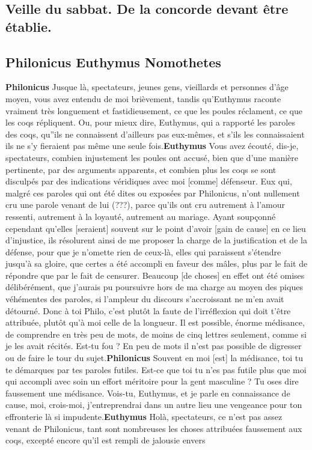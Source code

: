 \documentclass[12pt]{book}
\begin{document}
\begin{pages}
        \begin{Rightside}
        \beginnumbering
            \pstart\section*{Veille du sabbat. De la concorde devant être établie.}\pend\pstart\subsection*{ Philonicus Euthymus Nomothetes}\pend\pstart\textbf{Philonicus}\hspace{1cm} Jusque là, spectateurs, jeunes gens, vieillards et personnes d'âge moyen, vous avez entendu de moi brièvement, tandis qu'Euthymus raconte vraiment très longuement et fastidieusement, ce que les poules réclament, ce que les coqs répliquent. Ou, pour mieux dire, Euthymus, qui a rapporté les paroles des coqs, qu''ils ne connaissent d'ailleurs pas eux-mêmes, et s'ils les connaissaient ils ne s'y fieraient pas même une seule fois.\pend\pstart\textbf{Euthymus }\hspace{1cm} Vous avez écouté, dis-je, spectateurs, combien injustement les poules ont accusé, bien que d'une manière pertinente, par des arguments apparents, et combien plus les coqs se sont disculpés par des indications véridiques avec moi [comme] défenseur. Eux qui, malgré ces paroles qui ont été dites ou exposées par Philonicus, n'ont nullement cru une parole venant de lui (???), parce qu'ils ont cru autrement à l'amour ressenti, autrement à la loyauté, autrement au mariage. Ayant soupçonné cependant qu'elles [seraient] souvent sur le point d'avoir [gain de cause] en ce lieu d'injustice, ils résolurent ainsi de me proposer la charge de la justification et de la défense, pour que je n'omette rien de ceux-là, elles qui paraissent s'étendre jusqu'à sa gloire, que certes a été accompli en faveur des mâles, plus par le fait de répondre que par le fait de censurer. Beaucoup [de choses] en effet ont été omises délibérément, que j'aurais pu poursuivre hors de ma charge au moyen des piques véhémentes des paroles, si l'ampleur du discours s'accroissant ne m'en avait détourné. Donc à toi Philo, c'est plutôt la faute de l'irréflexion qui doit t'être attribuée, plutôt qu'à moi celle de la longueur. Il est possible, énorme médisance, de comprendre en très peu de mots, de moins de cinq lettres seulement, comme si je les avait récités. Est-tu fou ? En peu de mots il n'est pas possible de digresser ou de faire le tour du sujet.\pend\pstart\textbf{Philonicus }\hspace{1cm} Souvent en moi [est] la médisance, toi tu te démarques par tes paroles futiles. Est-ce que toi tu n'es pas futile plus que moi qui accompli avec soin un effort méritoire pour la gent masculine ? Tu oses dire faussement une médisance. Vois-tu, Euthymus, et je parle en connaissance de cause, moi, crois-moi, j'entreprendrai dans un autre lieu une vengeance pour ton effronterie là si impudente.\pend\pstart\textbf{Euthymus }\hspace{1cm} Holà, spectateurs, ce n'est pas assez venant de Philonicus, tant sont nombreuses les choses attribuées faussement aux coqs, excepté encore qu'il est rempli de jalousie envers 
\end{Rightside}
\end{pages}
\end{document}
